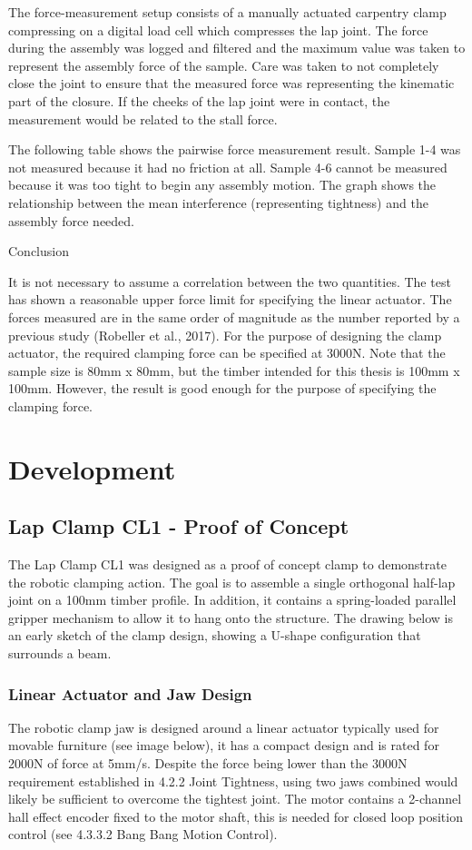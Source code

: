 The force-measurement setup consists of a manually actuated carpentry clamp compressing on a digital load cell which compresses the lap joint. The force during the assembly was logged and filtered and the maximum value was taken to represent the assembly force of the sample. Care was taken to not completely close the joint to ensure that the measured force was representing the kinematic part of the closure. If the cheeks of the lap joint were in contact, the measurement would be related to the stall force.

The following table shows the pairwise force measurement result. Sample 1-4 was not measured because it had no friction at all. Sample 4-6 cannot be measured because it was too tight to begin any assembly motion. The graph shows the relationship between the mean interference (representing tightness) and the assembly force needed. 

Conclusion

It is not necessary to assume a correlation between the two quantities. The test has shown a reasonable upper force limit for specifying the linear actuator. The forces measured are in the same order of magnitude as the number reported by a previous study (Robeller et al., 2017). For the purpose of designing the clamp actuator, the required clamping force can be specified at 3000N. 
Note that the sample size is 80mm x 80mm, but the timber intended for this thesis is 100mm x 100mm. However, the result is good enough for the purpose of specifying the clamping force.

\section{Development}

\subsection{Lap Clamp CL1 - Proof of Concept}
The Lap Clamp CL1 was designed as a proof of concept clamp to demonstrate the robotic clamping action. The goal is to assemble a single orthogonal half-lap joint on a 100mm timber profile. 
In addition, it contains a spring-loaded parallel gripper mechanism to allow it to hang onto the structure. The drawing below is an early sketch of the clamp design, showing a U-shape configuration that surrounds a beam.

\subsubsection{Linear Actuator and Jaw Design}
The robotic clamp jaw is designed around a linear actuator typically used for movable furniture (see image below), it has a compact design and is rated for 2000N of force at 5mm/s. Despite the force being lower than the 3000N requirement established in 4.2.2 Joint Tightness, using two jaws combined would likely be sufficient to overcome the tightest joint. The motor contains a 2-channel hall effect encoder fixed to the motor shaft, this is needed for closed loop position control (see 4.3.3.2 Bang Bang Motion Control). 


